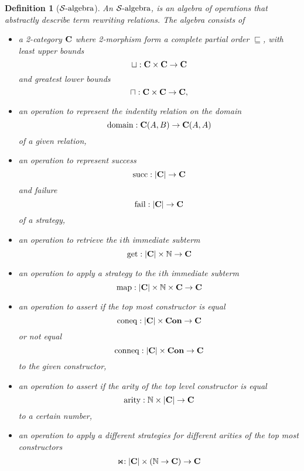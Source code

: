 \documentclass{article}
\newtheorem{definition}[theorem]{Definition}
\newcommand{\Constructor}{\ensuremath \Cat{Con}}
\newcommand{\Disc}[1]{\ensuremath \left\vert #1 \right\vert}
\newcommand{\Cat}[1]{\ensuremath \mathbf{#1}}
\newcommand{\Nat}{\ensuremath \mathbb{N}}
\newcommand{\Hom}[1]{\ensuremath #1}
\newcommand{\SAlgebra}{\ensuremath \mathcal{S}\text{-algebra}}
\newcommand{\domain}{\ensuremath \operatorname{domain}}
\newcommand{\lfail}{\ensuremath \operatorname{fail}}
\newcommand{\lsucc}{\ensuremath \operatorname{succ}}
\newcommand{\get}{\ensuremath \operatorname{get}}
\newcommand{\map}{\ensuremath \operatorname{map}}
\newcommand{\arity}{\ensuremath \operatorname{arity}}
\newcommand{\coneq}{\ensuremath \operatorname{coneq}}
\newcommand{\conneq}{\ensuremath \operatorname{conneq}}
\newcommand{\witharity}{\ensuremath \Join}
\begin{document}
\begin{definition}[$\SAlgebra$] \normalfont
  An $\SAlgebra$, is an algebra of operations that abstractly describe term rewriting relations. The algebra consists of
  \begin{itemize}
    \item a 2-category $\Cat{C}$ where 2-morphism form a complete partial order $\sqsubseteq$, with least upper bounds \[ \sqcup : \Hom{\Cat{C}} \times \Hom{\Cat{C}} \rightarrow \Hom{\Cat{C}} \] and greatest lower bounds \[ \sqcap : \Hom{\Cat{C}} \times \Hom{\Cat{C}} \rightarrow \Hom{\Cat{C}}, \]
    \item an operation to represent the indentity relation on the domain \[\domain : \Hom{\Cat{C}}(A,B) \rightarrow \Hom{\Cat{C}}(A,A) \] of a given relation,
    \item an operation to represent success \[\lsucc : \Disc{\Cat{C}} \rightarrow \Cat{C} \] and failure \[\lfail : \Disc{\Cat{C}} \rightarrow \Cat{C} \] of a strategy,
    \item an operation to retrieve the $i$th immediate subterm \[\get : \Disc{\Cat{C}} \times \Nat \rightarrow \Cat{C} \]
    \item an operation to apply a strategy to the $i$th immediate subterm \[\map : \Disc{\Cat{C}} \times \Nat \times \Cat{C} \rightarrow \Cat{C} \]
    \item an operation to assert if the top most constructor is equal \[\coneq : \Disc{\Cat{C}} \times \Constructor \rightarrow \Cat{C} \] or not equal \[ \conneq : \Disc{\Cat{C}} \times \Constructor \rightarrow \Cat{C} \] to the given constructor,
    \item an operation to assert if the arity of the top level constructor is equal \[\arity : \Nat \times \Disc{\Cat{C}} \rightarrow \Cat{C} \] to a certain number,
    \item an operation to apply a different strategies for different arities of the top most constructors
      \begin{align*}
        \witharity : \Disc{\Cat{C}} \times (\Nat \rightarrow \Cat{C}) \rightarrow \Cat{C}
      \end{align*}
  \end{itemize}


\end{definition}
\end{document}

